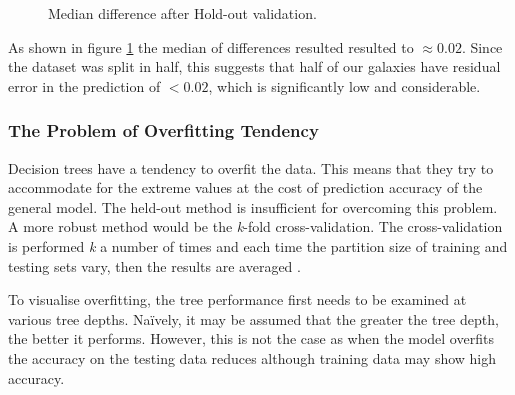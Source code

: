 \begin{figure}[H]
	\centering
	\caption{Median difference after Hold-out validation.}
	\label{fig:hvo}
\end{figure}
As shown in figure \ref{fig:hvo} the median of differences resulted resulted to $\approx0.02$. Since the dataset was split in half, this suggests that half of our galaxies have residual error in the prediction of $<0.02$, which is significantly low and considerable. 

\subsubsection{The Problem of Overfitting Tendency}
Decision trees have a tendency to overfit the data. This means that they try to accommodate for the extreme values at the cost of prediction accuracy of the general model. The held-out method is insufficient for overcoming this problem. A more robust method would be the \textit{k}-fold cross-validation. The cross-validation is performed \textit{k} a number of times and each time the partition size of training and testing sets vary, then the results are averaged \parencite{mitchell_machine_1997}.

To visualise overfitting, the tree performance first needs to be examined at various tree depths. Naïvely, it may be assumed that the greater the tree depth, the better it performs. However, this is not the case as when the model overfits the accuracy on the testing data reduces although training data may show high accuracy.

